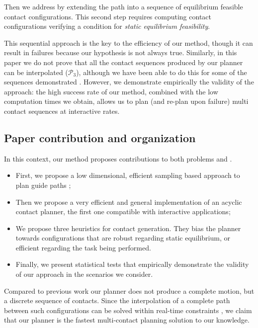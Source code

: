 Then we address \Pb by extending the path into a sequence of \gls{equilibrium feasible} contact configurations.
This second step requires computing contact configurations verifying a condition for \textit{static equilibrium feasibility}.

This sequential approach is the key to the efficiency of our method, though it
can result in failures because our hypothesis is not always true. Similarly, in this paper we do not 
prove that all the contact sequences produced by our planner can be interpolated ($\mathcal{P}_3$), although we have been able to do this
for some of the sequences demonstrated \citep{Carpentier2016}. However, we demonstrate empirically the validity of the approach: the high success rate of our method, combined with the low computation times we obtain, allows us to plan (and re-plan upon failure) multi contact sequences at \gls{interactive} rates.

\subsection{Paper contribution and organization}


In this context, our method proposes contributions to both problems \Pa and \Pb.
\begin{itemize}
\item First, we propose a low dimensional, efficient sampling based approach to plan guide paths ;
\item Then we propose a very efficient and general implementation of an acyclic contact planner, the first one compatible with \gls{interactive} applications;
\item We propose three heuristics for contact generation. They bias the planner towards configurations that are robust regarding static equilibrium, or 
efficient regarding the task being performed.
\item Finally, we present statistical tests that empirically demonstrate the validity of our approach in the scenarios we consider. 
\end{itemize}

Compared to previous work \citep{Mordatch:2012:DCB:2185520.2185539} our planner does not produce a complete motion, but a discrete sequence of contacts.
Since the interpolation of a complete path between such configurations can be solved within real-time constraints \citep{Carpentier2016}, we claim that our planner
is the fastest multi-contact planning solution to our knowledge.


